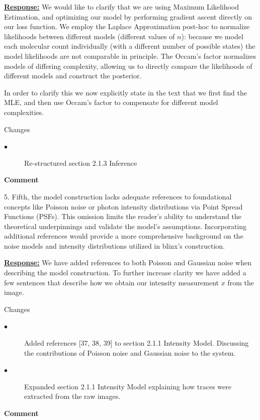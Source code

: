 \documentclass{article}
\begin{document}
 \underline{\textbf{Response:}}
 We would like to clarify that we are using Maximum Likelihood Estimation, and optimizing our model 
 by performing gradient ascent directly on our loss function. We employ the Laplace Approximation 
 post-hoc to normalize likelihoods between different models (different values of $n$): because we model each molecular count 
 individually (with a different number of possible states) the model likelihoods are not comparable 
 in principle. The Occam's factor normalizes models of differing complexity, allowing us to directly 
 compare the likelihoods of different models and construct the posterior.

 In order to clarify this we now explicitly state in the text that we first find the MLE, and then use Occam's factor to compensate 
 for different model complexities.

 Changes
 \begin{description}
    \item[$\bullet$] Re-structured section 2.1.3 Inference
\end{description}


\textbf{Comment}

5.	Fifth, the model construction lacks adequate references to foundational concepts 
like Poisson noise or photon intensity distributions via Point Spread Functions (PSFs). 
This omission limits the reader's ability to understand the theoretical underpinnings 
and validate the model's assumptions. Incorporating additional references would provide a 
more comprehensive background on the noise models and intensity distributions utilized in blinx's construction.

\underline{\textbf{Response:}} 
We have added references to both Poisson and Gaussian noise when describing the
model construction. To further increase clarity we have added a few sentences
that describe how we obtain our intensity measurement $x$ from the image. 

Changes
\begin{description}
    \item[$\bullet$] Added references [37, 38, 39] to section 2.1.1 Intensity Model. 
    Discussing the contributions of Poisson noise and Gaussian noise to the system.
    \item[$\bullet$] Expanded section 2.1.1 Intensity Model explaining 
    how traces were extracted from the raw images.  
\end{description}

\textbf{Comment}
\end{document}
